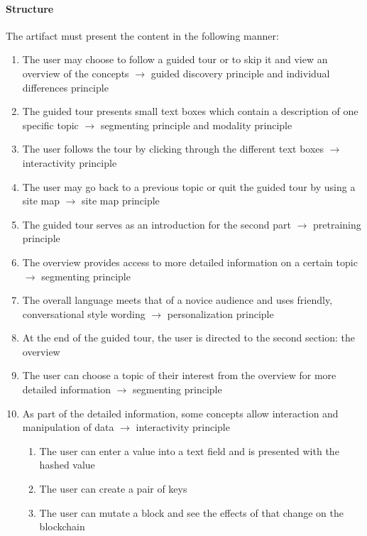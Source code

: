 \paragraph{Structure} The artifact must present the content in the following manner:
\begin{enumerate}[nosep]
\setcounter{enumi}{\value{foo}}
    \item The user may choose to follow a guided tour or to skip it and view an overview of the concepts $\rightarrow$ guided discovery principle and individual differences principle
    \item The guided tour presents small text boxes which contain a description of one specific topic $\rightarrow$ segmenting principle and modality principle
    \item The user follows the tour by clicking through the different text boxes $\rightarrow$ interactivity principle
    \item The user may go back to a previous topic or quit the guided tour by using a site map $\rightarrow$ site map principle
    \item The guided tour serves as an introduction for the second part $\rightarrow$ pretraining principle
    \item The overview provides access to more detailed information on a certain topic $\rightarrow$ segmenting principle
    \item The overall language meets that of a novice audience and uses friendly, conversational style wording $\rightarrow$ personalization principle
    \item At the end of the guided tour, the user is directed to the second section: the overview
    \item The user can choose a topic of their interest from the overview for more detailed information $\rightarrow$ segmenting principle
    \item As part of the detailed information, some concepts allow interaction and manipulation of data $\rightarrow$ interactivity principle
    \begin{enumerate}
        \item The user can enter a value into a text field and is presented with the hashed value
        \item The user can create a pair of keys 
        \item The user can mutate a block and see the effects of that change on the blockchain
    \end{enumerate}
\setcounter{foo}{\value{enumi}}
\end{enumerate}

